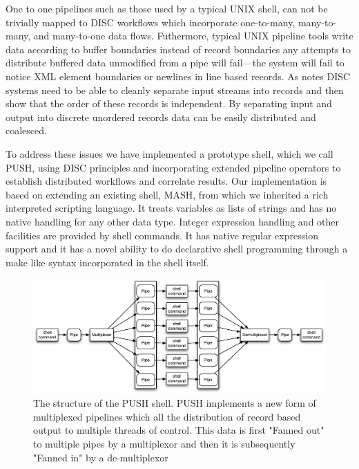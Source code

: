 \documentclass[11pt, letterpaper]{article}
\begin{document}
One to one pipelines such as those used by a typical UNIX shell, can not be 
trivially mapped to DISC workflows which incorporate one-to-many, many-to-many,
and many-to-one data flows. 
Futhermore, typical UNIX pipeline tools write data according to buffer 
boundaries instead of record boundaries any attempts to distribute buffered 
data unmodified from a pipe will fail---the system will fail to notice XML 
element boundaries or newlines in line based records. 
As \cite{pike2005idp} notes DISC systems need to be able to cleanly separate 
input streams into records and then show that the order of these records is 
independent. 
By separating input and output into discrete unordered records data can be 
easily distributed and coalesced.

To address these issues we have implemented a prototype shell, 
which we call PUSH, using DISC principles and incorporating extended 
pipeline operators to establish distributed workflows and correlate results.
Our implementation is based on extending an existing shell, MASH\cite{mashman}, 
from which we inherited a rich interpreted scripting language. 
It treats variables as lists of strings and has no native handling for any 
other data type. 
Integer expression handling and other facilities are provided by shell commands. 
It has native regular expression support and it has a novel ability to do 
declarative shell programming through a make like syntax incorporated in the 
shell itself.

\begin{figure}[htp]
\centering
\includegraphics[width=4.5in]{pipestruct.eps}
\caption{The structure of the PUSH shell. PUSH implements a new form of multiplexed pipelines which all the distribution of record based output to multiple threads of control. This data is first "Fanned out" to multiple pipes by a multiplexor and then it is subsequently "Fanned in" by a de-multiplexor}\label{fig:pipestruct} 
\end{figure}
\end{document}
